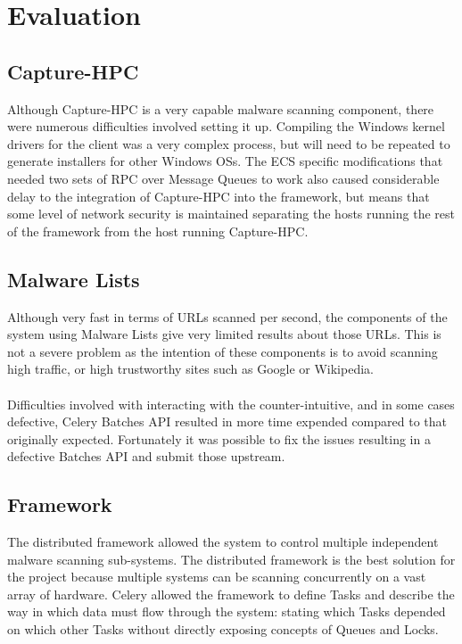 \section{Evaluation}








\subsection{Capture-HPC}
Although Capture-HPC is a very capable malware scanning component, there were
numerous difficulties involved setting it up. Compiling the Windows kernel
drivers for the client was a very complex process, but will need to be repeated
to generate installers for other Windows OSs. The ECS specific modifications
that needed two sets of RPC over Message Queues to work also caused considerable
delay to the integration of Capture-HPC into the framework, but means that some
level of network security is maintained separating the hosts running the rest of
the framework from the host running Capture-HPC.

\subsection{Malware Lists}
Although very fast in terms of URLs scanned per second, the components of the system using Malware Lists give very limited results about those URLs. This is not a severe problem as the intention of these components is to avoid scanning high traffic, or high trustworthy sites such as Google or Wikipedia.

\paragraph{}
Difficulties involved with interacting with the counter-intuitive, and in some cases defective, Celery Batches API resulted in more time expended compared to that originally expected. Fortunately it was possible to fix the issues resulting in a defective Batches API and submit those upstream.

\subsection{Framework}
The distributed framework allowed the system to control multiple independent malware scanning sub-systems.  The distributed framework is the best solution for the project because multiple systems can be scanning concurrently on a vast array of hardware. Celery allowed the framework to define Tasks and describe the way in which data must flow through the system: stating which Tasks depended on which other Tasks without directly exposing concepts of Queues and Locks.


